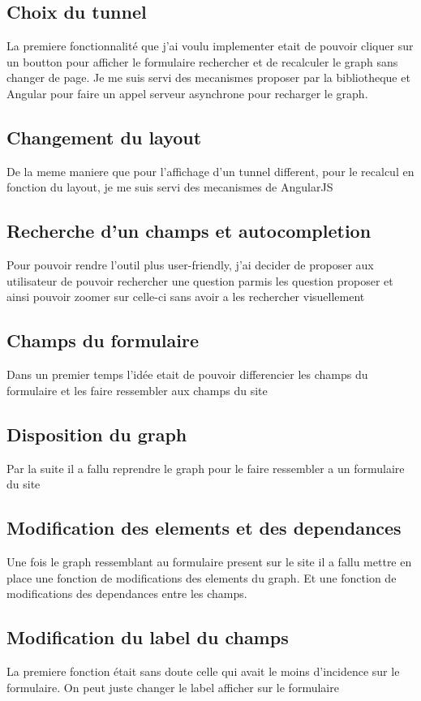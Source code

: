 \subsection{Choix du tunnel}
La premiere fonctionnalité que j’ai voulu implementer etait de pouvoir cliquer sur un boutton pour afficher le formulaire rechercher et de recalculer le graph sans changer de page. Je me suis servi des mecanismes proposer par la bibliotheque et Angular pour faire un appel serveur asynchrone pour recharger le graph.

\subsection{Changement du layout}
De la meme maniere que pour l’affichage d’un tunnel different, pour le recalcul en fonction du layout, je me suis servi des mecanismes de AngularJS

\subsection{Recherche d’un champs et autocompletion}
Pour pouvoir rendre l’outil plus user-friendly, j’ai decider de proposer aux utilisateur de pouvoir rechercher une question parmis les question proposer et ainsi pouvoir zoomer sur celle-ci sans avoir a les rechercher visuellement

\subsection{Champs du formulaire}
Dans un premier temps l’idée etait de pouvoir differencier les champs du formulaire et les faire ressembler aux champs du site

\subsection{Disposition du graph}
Par la suite il a fallu reprendre le graph pour le faire ressembler a un formulaire du site

\subsection{Modification des elements et des dependances}
Une fois le graph ressemblant au formulaire present sur le site il a fallu mettre en place une fonction de modifications des elements du graph. Et une fonction de modifications des dependances entre les champs.

\subsection{Modification du label du champs}
La premiere fonction était sans doute celle qui avait le moins d’incidence sur le formulaire. On peut juste changer le label afficher sur le formulaire

